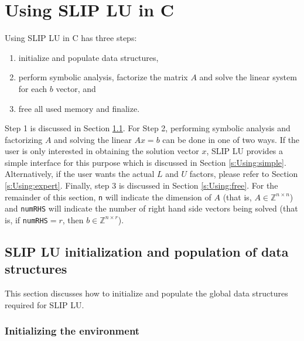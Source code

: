 \documentclass[12pt]{article}
\theoremstyle{definition}
\begin{document}
\cprotect\section{Using SLIP LU in C} \label{s:Using}

Using SLIP LU in C has three steps:

\begin{enumerate}
\item initialize and populate data structures,
\item perform symbolic analysis,
factorize the matrix $A$ and solve the linear
system for each $b$ vector, and
\item free all used memory and finalize.
\end{enumerate}

Step 1 is discussed in Section \ref{s:Using:init}.  For Step 2, performing
symbolic analysis and factorizing $A$ and solving the linear $A x =b$ can be
done in one of two ways. If the user is only interested in obtaining the
solution vector $x$, SLIP LU provides a simple interface for this purpose which
is discussed in Section \ref{s:Using:simple}.  Alternatively, if the user wants
the actual $L$ and $U$ factors, please refer to Section \ref{s:Using:expert}.
Finally, step 3 is discussed in Section \ref{s:Using:free}. For the remainder
of this section, \verb|n| will indicate the dimension of $A$ (that is, $A \in
\mathbb{Z}^{n \times n}$) and \verb|numRHS| will indicate the number of right
hand side vectors being solved (that is, if \verb|numRHS|$= r$, then $b \in
\mathbb{Z}^{n \times r}$).

\cprotect\subsection{SLIP LU initialization and population of data structures}
\label{s:Using:init}

This section discusses how to initialize and populate the global data
structures required for SLIP LU.

\subsubsection{Initializing the environment}
\end{document}
